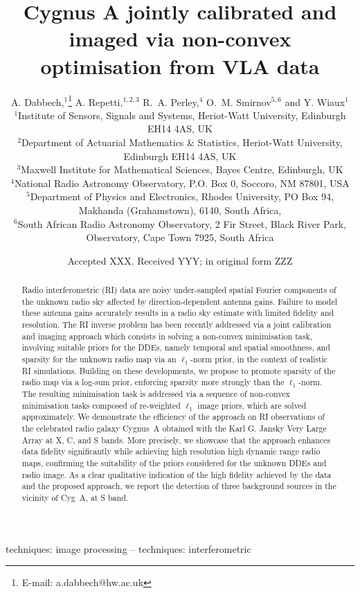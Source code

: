 \documentclass[fleqn,usenatbib]{mnras}
\title[]{Cygnus A jointly calibrated and imaged via non-convex optimisation from {{VLA}} data}
\author[A. Dabbech et al.]{
A. Dabbech,$^{1}$\thanks{E-mail: a.dabbech@hw.ac.uk}
A. Repetti,$^{1,2,3}$
R.~A. Perley,$^{4}$
O.~{M}. Smirnov$^{5,6}$
and Y. Wiaux$^{1}$
\\
$^{1}$Institute of Sensors, Signals and Systems, Heriot-Watt University, Edinburgh EH14 4AS, UK\\
$^{2}$Department of Actuarial Mathematics \& Statistics, Heriot-Watt University, Edinburgh EH14 4AS, UK\\
$^{3}$Maxwell Institute for Mathematical Sciences, Bayes Centre, Edinburgh, UK\\
$^{4}$National Radio Astronomy Observatory, P.O. Box 0, Soccoro, NM 87801, USA\\
$^{5}$Department of Physics and Electronics, Rhodes University, PO Box 94, {{Makhanda}} (Grahamstown), 6140, South Africa,\\
$^{6}${{South African Radio Astronomy Observatory, 2 Fir Street, Black River Park, Observatory, Cape Town 7925, South Africa}}
\\
}
\date{Accepted XXX. Received YYY; in original form ZZZ}
\begin{document}
\label{firstpage}
\pagerange{\pageref{firstpage}--\pageref{lastpage}}
\maketitle
\begin{abstract}


Radio interferometric (RI) data are noisy under-sampled spatial Fourier components of the unknown radio sky affected by direction-dependent antenna gains. Failure to model these antenna gains accurately results in a radio sky estimate with limited fidelity and resolution. The RI inverse problem has been recently addressed via a joint calibration and imaging approach which consists in solving a non-convex minimisation task, involving suitable priors for the DDEs, namely temporal and spatial smoothness, and sparsity for the unknown radio map via an $\ell_1$-norm prior, in the context of realistic RI simulations. Building on these developments, we propose to promote sparsity of the radio map {{via a log-sum prior, enforcing sparsity more strongly than the $\ell_1$-norm}}. 
The resulting minimisation task is addressed via a sequence of non-convex minimisation tasks composed of re-weighted $\ell_1$ image priors, which are solved approximately. We demonstrate the efficiency of the approach on RI observations of the celebrated radio galaxy Cygnus~A obtained with the Karl G. Jansky Very Large Array at X, C, and S bands. More precisely, we showcase that the approach enhances data fidelity significantly while achieving high resolution high dynamic range radio maps, confirming the suitability of the priors considered for the unknown DDEs and radio image. As a clear qualitative indication of the high fidelity achieved by the data and the proposed approach, we report the detection of three background sources in the vicinity of Cyg~A, at S band.
\end{abstract}

\begin{keywords}
techniques: image processing -- techniques: interferometric
\end{keywords}

\end{document}
